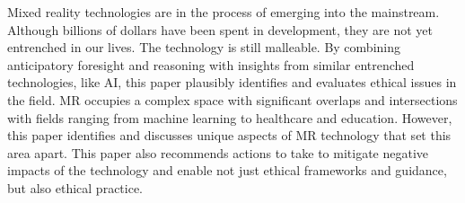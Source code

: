 Mixed reality technologies are in the process of emerging into the mainstream. Although billions of dollars have been spent in development, they are not yet entrenched in our lives. The technology is still malleable. By combining anticipatory foresight and reasoning with insights from similar entrenched technologies, like AI, this paper plausibly identifies and evaluates ethical issues in the field. MR occupies a complex space with significant overlaps and intersections with fields ranging from machine learning to healthcare and education. However, this paper identifies and discusses unique aspects of MR technology that set this area apart. This paper also recommends actions to take to mitigate negative impacts of the technology and enable not just ethical frameworks and guidance, but also ethical practice.
